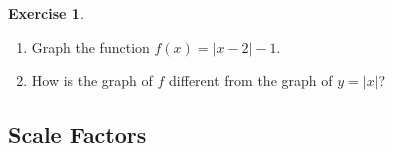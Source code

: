\documentclass[10pt,]{book}
\theoremstyle{plain}
\theoremstyle{definition}
\newtheorem{exercise}[theorem]{Exercise}
\theoremstyle{definition}
\numberwithin{equation}{section}
\newcommand\abs[1]{\left|#1\right|}
\begin{document}
\begin{exercise}\label{exercise-translate-abs2}
\leavevmode%
\begin{enumerate}[label=*\alph**]
\item\hypertarget{li-306}{}Graph the function \(f (x) = \abs{x − 2} − 1\).\item\hypertarget{li-307}{}How is the graph of \(f\) different from the graph of \(y=\abs{x}\)?\end{enumerate}
\end{exercise}
\typeout{************************************************}
\typeout{************************************************}
\subsection[Scale Factors]{Scale Factors}\label{subsection-44}
\end{document}
